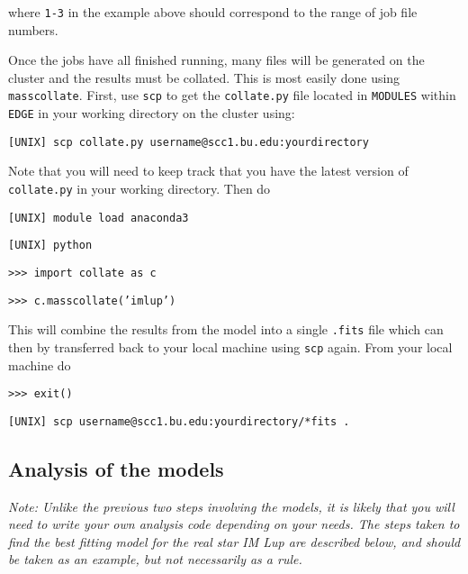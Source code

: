 \documentclass{article}
\begin{document}
where \texttt{1-3} in the example above should correspond to the range of job file numbers.

Once the jobs have all finished running, many files will be generated on the cluster and the results must be collated. This is most easily done using \texttt{masscollate}. First, use \texttt{scp} to get the \texttt{collate.py} file located in \texttt{MODULES} within \texttt{EDGE} in your working directory on the cluster using:

\vspace{2mm}
\texttt{[UNIX] scp collate.py username@scc1.bu.edu:yourdirectory}
\vspace{2mm}

\noindent Note that you will need to keep track that you have the latest version of \texttt{collate.py} in your working directory.  Then do

\vspace{2mm}
\texttt{[UNIX] module load anaconda3}
\vspace{2mm}

\vspace{2mm}
\texttt{[UNIX] python} 
\vspace{2mm}

\vspace{2mm}
\texttt{>>> import collate as c}

\texttt{>>> c.masscollate('imlup')}
\vspace{2mm}

\noindent This will combine the results from the model into a single  \texttt{.fits} file which can then by transferred back to your local machine using \texttt{scp} again.  From your local machine do

\vspace{2mm}
\texttt{>>> exit()}
\vspace{2mm}

\vspace{2mm}
\texttt{[UNIX] scp username@scc1.bu.edu:yourdirectory/*fits .}
\vspace{2mm}


\subsection{Analysis of the models}

\textit{Note: Unlike the previous two steps involving the models, it is likely that you will need to write your own analysis code depending on your needs. The steps taken to find the best fitting model for the real star IM Lup are described below, and should be taken as an example, but not necessarily as a rule.}
\vspace{2mm}
\end{document}

